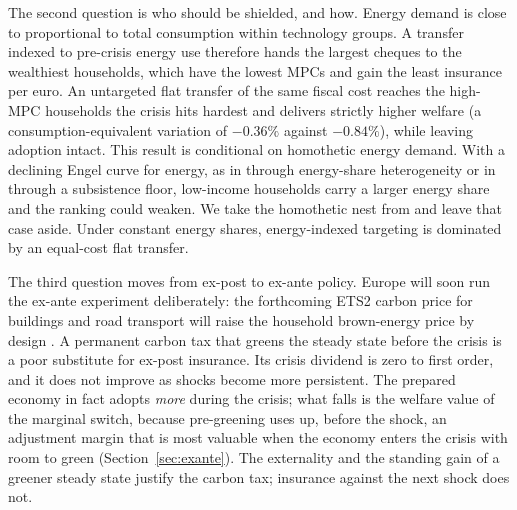 The second question is who should be shielded, and how. Energy demand is close
to proportional to total consumption within technology groups. A transfer
indexed to pre-crisis energy use therefore hands the largest cheques to the
wealthiest households, which have the lowest MPCs and gain the least insurance per euro. An untargeted flat transfer of the same fiscal cost
reaches the high-MPC households the crisis hits hardest and delivers strictly
higher welfare (a consumption-equivalent variation of $-0.36\%$ against
$-0.84\%$), while leaving adoption intact. This result is conditional on
homothetic energy demand. With a declining Engel curve for energy, as in
\citet{bayer2026hank} through energy-share heterogeneity or in \citet{langot2026tariff}
through a subsistence floor, low-income households carry a larger energy share
and the ranking could weaken. We take the homothetic nest from \citet{auclert2023energy}
and leave that case aside. Under constant energy shares, energy-indexed
targeting is dominated by an equal-cost flat transfer.

The third question moves from ex-post to ex-ante policy. Europe will soon run
the ex-ante experiment deliberately: the forthcoming ETS2 carbon price for
buildings and road transport will raise the household brown-energy price by
design \citep{ECETS2}. A permanent carbon tax that greens the steady state
before the crisis is a poor substitute for ex-post insurance. Its crisis
dividend is zero to first order, and it does not improve as shocks become more
persistent. The prepared economy in fact adopts \emph{more} during the crisis; what falls is
the welfare value of the marginal switch, because pre-greening uses up, before
the shock, an adjustment margin that is most valuable when the economy enters
the crisis with room to green (Section~\ref{sec:exante}). The externality and
the standing gain of a greener steady state justify the carbon tax; insurance
against the next shock does not.


